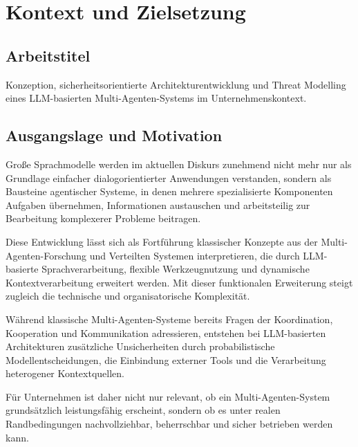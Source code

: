 %

\section{Kontext und Zielsetzung}

\subsection{Arbeitstitel}

Konzeption, sicherheitsorientierte Architekturentwicklung und Threat Modelling eines LLM-basierten Multi-Agenten-Systems im Unternehmenskontext.

\subsection{Ausgangslage und Motivation}

Große Sprachmodelle werden im aktuellen Diskurs zunehmend nicht mehr nur als Grundlage einfacher dialogorientierter Anwendungen verstanden, sondern als Bausteine agentischer Systeme, in denen mehrere spezialisierte Komponenten Aufgaben übernehmen, Informationen austauschen und arbeitsteilig zur Bearbeitung komplexerer Probleme beitragen. \cite{wooldridge_intelligent_1995,jennings_roadmap_1998,botti_agentic_2025}

Diese Entwicklung lässt sich als Fortführung klassischer Konzepte aus der Multi-Agenten-Forschung und Verteilten Systemen interpretieren, die durch LLM-basierte Sprachverarbeitung, flexible Werkzeugnutzung und dynamische Kontextverarbeitung erweitert werden. \cite{jennings_roadmap_1998,yan_beyond_2025,wang_large_2026} Mit dieser funktionalen Erweiterung steigt zugleich die technische und organisatorische Komplexität. \cite{jennings_roadmap_1998,wong_adding_2000,ferrag_prompt_2026}

Während klassische Multi-Agenten-Systeme bereits Fragen der Koordination, Kooperation und Kommunikation adressieren, entstehen bei LLM-basierten Architekturen zusätzliche Unsicherheiten durch probabilistische Modellentscheidungen, die Einbindung externer Tools und die Verarbeitung heterogener Kontextquellen. \cite{wong_adding_2000,ferrag_prompt_2026,raza_trism_2026}

Für Unternehmen ist daher nicht nur relevant, ob ein Multi-Agenten-System grundsätzlich leistungsfähig erscheint, sondern ob es unter realen Randbedingungen nachvollziehbar, beherrschbar und sicher betrieben werden kann. \cite{raza_trism_2026,ferrag_prompt_2026}

